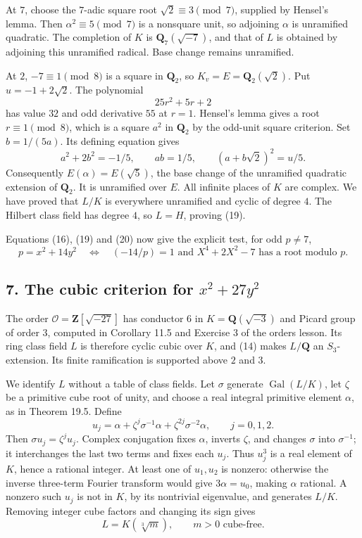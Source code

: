 \documentclass[11pt,a4paper]{article}
\begin{document}
At \(7\), choose the \(7\)-adic square root \(\sqrt2\equiv3\pmod7\),
supplied by Hensel's lemma. Then \(\alpha^2\equiv5\pmod7\) is a
nonsquare unit, so adjoining \(\alpha\) is unramified quadratic. The
completion of \(K\) is \(\mathbf Q_7(\sqrt{-7})\), and that of \(L\) is
obtained by adjoining this unramified radical. Base change remains
unramified.

At \(2\), \(-7\equiv1\pmod8\) is a square in \(\mathbf Q_2\), so
\(K_v=E=\mathbf Q_2(\sqrt2)\). Put \(u=-1+2\sqrt2\). The polynomial \[
25r^2+5r+2
\] has value \(32\) and odd derivative \(55\) at \(r=1\). Hensel's lemma
gives a root \(r\equiv1\pmod8\), which is a square \(a^2\) in
\(\mathbf Q_2\) by the odd-unit square criterion. Set \(b=1/(5a)\). Its
defining equation gives \[
a^2+2b^2=-1/5,\qquad ab=1/5,
\qquad (a+b\sqrt2)^2=u/5.
\tag{21}
\] Consequently \(E(\alpha)=E(\sqrt5)\), the base change of the
unramified quadratic extension of \(\mathbf Q_2\). It is unramified over
\(E\). All infinite places of \(K\) are complex. We have proved that
\(L/K\) is everywhere unramified and cyclic of degree \(4\). The Hilbert
class field has degree \(4\), so \(L=H\), proving (19).

Equations (16), (19) and (20) now give the explicit test, for odd
\(p\ne7\), \[
p=x^2+14y^2\quad\Longleftrightarrow\quad
(-14/p)=1\text{ and }X^4+2X^2-7\text{ has a root modulo }p.
\tag{22}
\]

\subsection{\texorpdfstring{7. The cubic criterion for
\(x^2+27y^2\)}{7. The cubic criterion for x\^{}2+27y\^{}2}}\label{the-cubic-criterion-for-x227y2}

The order \(\mathcal O=\mathbf Z[\sqrt{-27}]\) has conductor \(6\) in
\(K=\mathbf Q(\sqrt{-3})\) and Picard group of order \(3\), computed in
Corollary 11.5 and Exercise 3 of the orders lesson. Its ring class field
\(L\) is therefore cyclic cubic over \(K\), and (14) makes
\(L/\mathbf Q\) an \(S_3\)-extension. Its finite ramification is
supported above \(2\) and \(3\).

We identify \(L\) without a table of class fields. Let \(\sigma\)
generate \(\operatorname{Gal}(L/K)\), let \(\zeta\) be a primitive cube
root of unity, and choose a real integral primitive element \(\alpha\),
as in Theorem 19.5. Define \[
u_j=\alpha+\zeta^j\sigma^{-1}\alpha+\zeta^{2j}\sigma^{-2}\alpha,
\qquad j=0,1,2.
\tag{23}
\] Then \(\sigma u_j=\zeta^j u_j\). Complex conjugation fixes
\(\alpha\), inverts \(\zeta\), and changes \(\sigma\) into
\(\sigma^{-1}\); it interchanges the last two terms and fixes each
\(u_j\). Thus \(u_j^3\) is a real element of \(K\), hence a rational
integer. At least one of \(u_1,u_2\) is nonzero: otherwise the inverse
three-term Fourier transform would give \(3\alpha=u_0\), making
\(\alpha\) rational. A nonzero such \(u_j\) is not in \(K\), by its
nontrivial eigenvalue, and generates \(L/K\). Removing integer cube
factors and changing its sign gives \[
L=K(\sqrt[3]m),\qquad m>0\text{ cube-free}.
\tag{24}
\]
\end{document}
